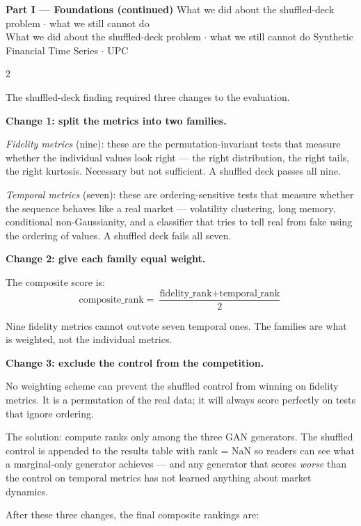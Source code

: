 \documentclass[10pt]{article}
\newcommand{\tealbox}[2]{\begin{tcolorbox}[mybox={Teal}{LBg},title={#1}]#2\end{tcolorbox}}
\newcommand{\pagehead}[2]{%
  \begin{tcolorbox}[enhanced,arc=0pt,outer arc=0pt,boxrule=0pt,
    colback=Navy,colframe=Navy,
    top=5pt,bottom=5pt,left=8pt,right=8pt,
    before skip=0pt,after skip=10pt]
  {\color{white}\large\bfseries #1}%
  \ifx\relax#2\relax\else\\[1pt]{\color{blue!30!white}\small #2}\fi
  \hfill{\color{blue!20!white}\footnotesize Synthetic Financial Time Series $\cdot$ UPC}
  \end{tcolorbox}}
\begin{document}
\clearpage

\pagehead{Part I --- Foundations (continued)}
         {What we did about the shuffled-deck problem $\cdot$ what we still cannot do}

\begin{multicols}{2}

\tealbox{8\quad What We Did About It}{%
The shuffled-deck finding required three changes to the evaluation.

\medskip
\textbf{Change 1: split the metrics into two families.}

\textit{Fidelity metrics} (nine): these are the permutation-invariant tests that measure whether the individual values look right --- the right distribution, the right tails, the right kurtosis. Necessary but not sufficient. A shuffled deck passes all nine.

\textit{Temporal metrics} (seven): these are ordering-sensitive tests that measure whether the sequence behaves like a real market --- volatility clustering, long memory, conditional non-Gaussianity, and a classifier that tries to tell real from fake using the ordering of values. A shuffled deck fails all seven.

\medskip
\textbf{Change 2: give each family equal weight.}

The composite score is:
\begin{equation*}
  \text{composite\_rank} = \frac{\text{fidelity\_rank} + \text{temporal\_rank}}{2}
\end{equation*}

Nine fidelity metrics cannot outvote seven temporal ones. The families are what is weighted, not the individual metrics.

\medskip
\textbf{Change 3: exclude the control from the competition.}

No weighting scheme can prevent the shuffled control from winning on fidelity metrics. It is a permutation of the real data; it will always score perfectly on tests that ignore ordering.

The solution: compute ranks only among the three GAN generators. The shuffled control is appended to the results table with rank = NaN so readers can see what a marginal-only generator achieves --- and any generator that scores \emph{worse} than the control on temporal metrics has not learned anything about market dynamics.

\medskip
After these three changes, the final composite rankings are:

}
\end{multicols}
\end{document}
